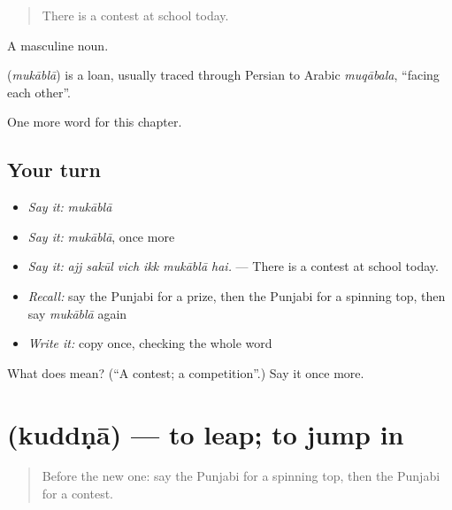 \begin{quote}
There is a contest at school today.
\end{quote}

A masculine noun.

\begin{cousinweb}
\textbf{} (\emph{mukāblā}) is a loan, usually traced through Persian to Arabic \emph{muqābala}, \textquotedblleft{}facing each other\textquotedblright{}.
\end{cousinweb}

\begin{grammarlens}[title={What you've built}]
One more word for this chapter.
\end{grammarlens}

\subsection*{Your turn}
\begin{itemize}
\raggedright
  \item \emph{Say it:} \emph{mukāblā}
  \item \emph{Say it:} \emph{mukāblā}, once more
  \item \emph{Say it:} \emph{ajj sakūl vich ikk mukāblā hai.} — There is a contest at school today.
  \item \emph{Recall:} say the Punjabi for a prize, then the Punjabi for a spinning top, then say \emph{mukāblā} again
  \item \emph{Write it:} copy \textbf{} once, checking the whole word
\end{itemize}

\begin{tcolorbox}[breakable,colback=teal!4,colframe=teal!35!black,title={Before you move on}]
What does  mean? (\textquotedblleft{}A contest; a competition\textquotedblright{}.) Say it once more.
\end{tcolorbox}
\section[\texorpdfstring{\pa{ਕੁੱਦਣਾ} (kuddṇā)}{ਕੁੱਦਣਾ (kuddṇā)}]{ (kuddṇā) — to leap; to jump in}

\label{lesson:PA-C353-kuddna}



\begin{quote}
Before the new one: say the Punjabi for a spinning top, then the Punjabi for a contest.
\end{quote}


